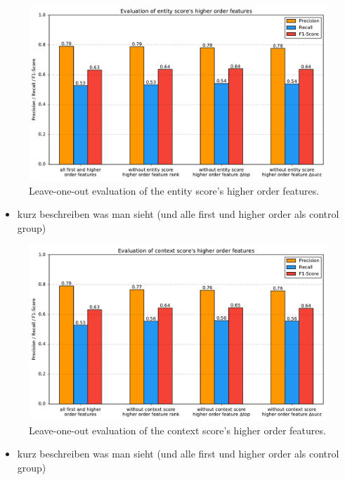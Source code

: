 \begin{figure}[H]
	\centering
	\includegraphics[width=\textwidth]{img/higher_order_eval_entity}
	\caption{Leave-one-out evaluation of the entity score's higher order features.}
	\label{ho_eval_entity}
\end{figure}
\begin{itemize}
	\item kurz beschreiben was man sieht (und alle first und higher order als control group)
\end{itemize}

\begin{figure}[H]
	\centering
	\includegraphics[width=\textwidth]{img/higher_order_eval_context}
	\caption{Leave-one-out evaluation of the context score's higher order features.}
	\label{ho_eval_context}
\end{figure}
\begin{itemize}
	\item kurz beschreiben was man sieht (und alle first und higher order als control group)
\end{itemize}












